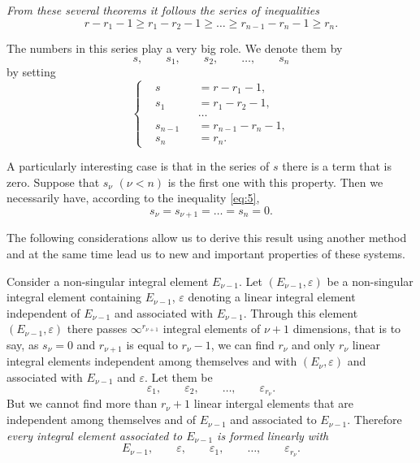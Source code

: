 \documentclass[leqno,11pt]{book}
\makeatletter
\theoremstyle{shape1}
\theoremstyle{shapesmall}
\let\old@epsilon\epsilon
\let\old@varepsilon\varepsilon
\let\epsilon\old@varepsilon
\let\varepsilon\old@epsilon
\makeatother
\begin{document}
\emph{From these several theorems it follows the series of inequalities}
\begin{equation}
  \label{eq:5}
  r-r_{1}-1\ge r_{1}-r_{2}-1\ge \dots\ge r_{n-1}-r_{n}-1\ge r_{n}.
\end{equation}

The numbers in this series play a very big role. We denote them by
\[
s,\qquad s_{1},\qquad s_{2},\qquad \dots,\qquad s_{n}
\]
by setting
\begin{equation}
  \label{eq:6}
  \left\{
    \begin{alignedat}{3}
      &s&&=r-r_{1}-1,\\
      &s_{1}&&=r_{1}-r_{2}-1,\\
      &&&\dots\\
      &s_{n-1}&&=r_{n-1}-r_{n}-1,\\
      &s_{n}&&=r_{n}.
    \end{alignedat}
  \right.
\end{equation}

A particularly interesting case is that in the series of $s$ there is a term that is zero. Suppose that $s_{\nu}$ $(\nu<n)$ is the first one with this property. Then we necessarily have, according to the inequality \eqref{eq:5},
\[
s_{\nu}=s_{\nu+1}=\dots=s_{n}=0.
\]

The following considerations allow us to derive this result using another method and at the same time lead us to new and important properties of these systems.

Consider a non-singular integral element $E_{\nu-1}$. Let $(E_{\nu-1},\epsilon)$ be a non-singular integral element containing $E_{\nu-1}$, $\epsilon$ denoting a linear integral element independent of $E_{\nu-1}$ and associated with $E_{\nu-1}$. Through this element $(E_{\nu-1},\epsilon)$ there passes $\infty^{r_{\nu+1}}$ integral elements of $\nu+1$ dimensions, that is to say, as $s_{\nu}=0$ and $r_{\nu+1}$ is equal to $r_{\nu}-1$, we can find $r_{\nu}$ and only $r_{\nu}$ linear integral elements independent among themselves and with $(E_{\nu},\epsilon)$ and associated with $E_{\nu-1}$ and $\epsilon$. Let them be
\[
\epsilon_{1},\qquad \epsilon_{2},\qquad \dots,\qquad\epsilon_{r_{\nu}}.
\]
But we cannot find more than $r_{\nu}+1$ linear intergal elements that are independent among themselves and of $E_{\nu-1}$ and associated to $E_{\nu-1}$. Therefore \emph{every integral element associated to $E_{\nu-1}$ is formed linearly with}
\[
E_{\nu-1},\qquad\epsilon,\qquad\epsilon_{1},\qquad\dots,\qquad\epsilon_{r_{\nu}}.
\]
\end{document}
